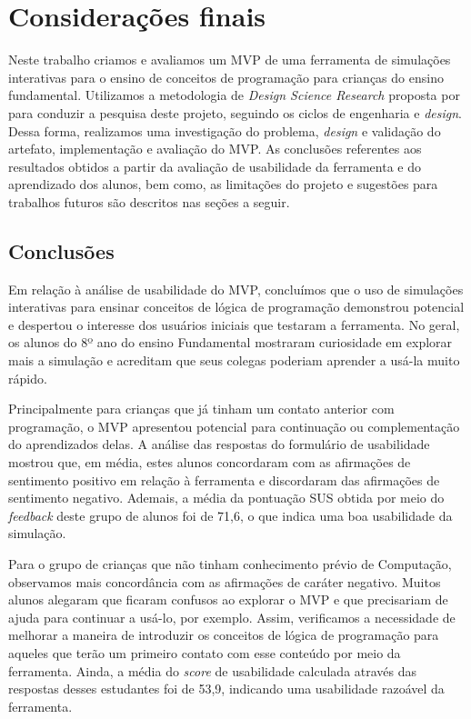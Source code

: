 
\chapter{Considerações finais}

Neste trabalho criamos e avaliamos um MVP de uma ferramenta de simulações interativas para o ensino de conceitos de programação para crianças do ensino fundamental. Utilizamos a metodologia de \textit{Design Science Research} proposta por \citet{wieringa2014design} para conduzir a pesquisa deste projeto, seguindo os ciclos de engenharia e \textit{design}. Dessa forma, realizamos uma investigação do problema, \textit{design} e validação do artefato, implementação e avaliação do MVP. As conclusões referentes aos resultados obtidos a partir da avaliação de usabilidade da ferramenta e do aprendizado dos alunos, bem como, as limitações do projeto e sugestões para trabalhos futuros são descritos nas seções a seguir.

\section{Conclusões}

Em relação à análise de usabilidade do MVP, concluímos que o uso de simulações interativas para ensinar conceitos de lógica de programação demonstrou potencial e despertou o interesse dos usuários iniciais que testaram a ferramenta. No geral, os alunos do 8º ano do ensino Fundamental mostraram curiosidade em explorar mais a simulação e acreditam que seus colegas poderiam aprender a usá-la muito rápido.

Principalmente para crianças que já tinham um contato anterior com programação, o MVP apresentou potencial para continuação ou complementação do aprendizados delas. A análise das respostas do formulário de usabilidade mostrou que, em média, estes alunos concordaram com as afirmações de sentimento positivo em relação à ferramenta e discordaram das afirmações de sentimento negativo. Ademais, a média da pontuação SUS obtida por meio do \textit{feedback} deste grupo de alunos foi de 71,6, o que indica uma boa usabilidade da simulação.

Para o grupo de crianças que não tinham conhecimento prévio de Computação, observamos mais concordância com as afirmações de caráter negativo. Muitos alunos alegaram que ficaram confusos ao explorar o MVP e que precisariam de ajuda para continuar a usá-lo, por exemplo. Assim, verificamos a necessidade de melhorar a maneira de introduzir os conceitos de lógica de programação para aqueles que terão um primeiro contato com esse conteúdo por meio da ferramenta. Ainda, a média do \textit{score} de usabilidade calculada através das respostas desses estudantes foi de 53,9, indicando uma usabilidade razoável da ferramenta.

